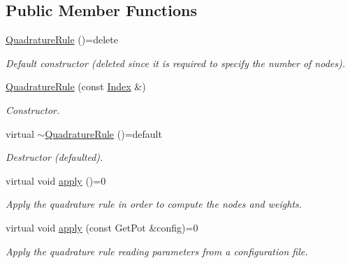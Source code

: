 \subsection*{Public Member Functions}
\begin{DoxyCompactItemize}
\item 
\hypertarget{classQuadratureRule_ac7fb9aaf8e3f9eae03235f68a935880a}{\hyperlink{classQuadratureRule_ac7fb9aaf8e3f9eae03235f68a935880a}{Quadrature\-Rule} ()=delete}\label{classQuadratureRule_ac7fb9aaf8e3f9eae03235f68a935880a}

\begin{DoxyCompactList}\small\item\em Default constructor (deleted since it is required to specify the number of nodes). \end{DoxyCompactList}\item 
\hyperlink{classQuadratureRule_a1d658803a64ae7aa2d9a59754483f8a0}{Quadrature\-Rule} (const \hyperlink{typedefs_8h_a2c726f8f32697958e9d6c2afecda531d}{Index} \&)
\begin{DoxyCompactList}\small\item\em Constructor. \end{DoxyCompactList}\item 
\hypertarget{classQuadratureRule_a80e11fbb08b332f2d4c56740cb63ac4e}{virtual \hyperlink{classQuadratureRule_a80e11fbb08b332f2d4c56740cb63ac4e}{$\sim$\-Quadrature\-Rule} ()=default}\label{classQuadratureRule_a80e11fbb08b332f2d4c56740cb63ac4e}

\begin{DoxyCompactList}\small\item\em Destructor (defaulted). \end{DoxyCompactList}\item 
\hypertarget{classQuadratureRule_ae8035f1283a63c55fbbfb4e786db8a98}{virtual void \hyperlink{classQuadratureRule_ae8035f1283a63c55fbbfb4e786db8a98}{apply} ()=0}\label{classQuadratureRule_ae8035f1283a63c55fbbfb4e786db8a98}

\begin{DoxyCompactList}\small\item\em Apply the quadrature rule in order to compute the nodes and weights. \end{DoxyCompactList}\item 
virtual void \hyperlink{classQuadratureRule_a0eac623f625d4faa872b1b031db76a75}{apply} (const Get\-Pot \&config)=0
\begin{DoxyCompactList}\small\item\em Apply the quadrature rule reading parameters from a configuration file. \end{DoxyCompactList}\end{DoxyCompactItemize}
